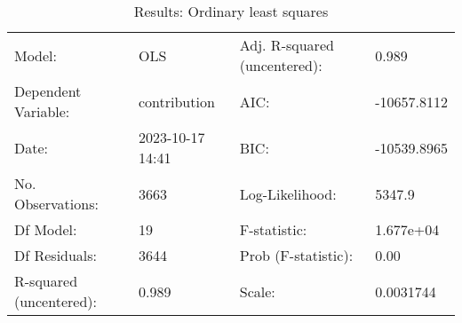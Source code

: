 \begin{table}
\caption{Results: Ordinary least squares}
\label{}
\begin{center}
\begin{tabular}{llll}
\hline
Model:                  & OLS              & Adj. R-squared (uncentered): & 0.989        \\
Dependent Variable:     & contribution     & AIC:                         & -10657.8112  \\
Date:                   & 2023-10-17 14:41 & BIC:                         & -10539.8965  \\
No. Observations:       & 3663             & Log-Likelihood:              & 5347.9       \\
Df Model:               & 19               & F-statistic:                 & 1.677e+04    \\
Df Residuals:           & 3644             & Prob (F-statistic):          & 0.00         \\
R-squared (uncentered): & 0.989            & Scale:                       & 0.0031744    \\
\hline
\end{tabular}
\end{center}


\end{table}
